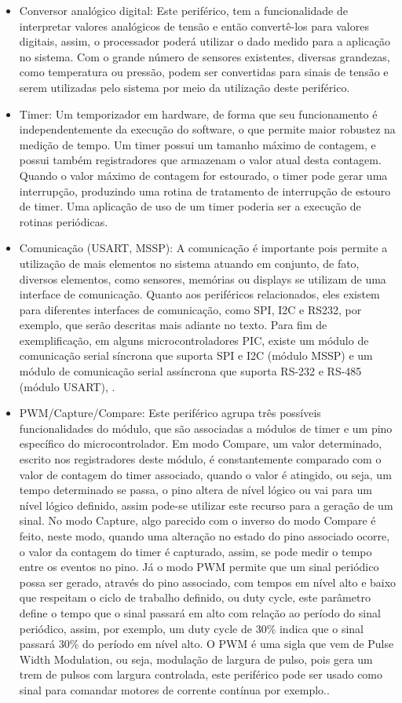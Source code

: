 \begin{itemize}
    \item Conversor analógico digital:
    Este periférico, tem a funcionalidade de interpretar valores analógicos de tensão e então convertê-los para valores digitais, assim, o processador poderá utilizar o dado medido para a aplicação no sistema. Com o grande número de sensores existentes, diversas grandezas, como temperatura ou pressão, podem ser convertidas para sinais de tensão e serem utilizadas pelo sistema por meio da utilização deste periférico.
    \item Timer:
    Um temporizador em hardware, de forma que seu funcionamento é independentemente da execução do software, o que permite maior robustez na medição de tempo. Um timer possui um tamanho máximo de contagem, e possui também registradores que armazenam o valor atual desta contagem. Quando o valor máximo de contagem for estourado, o timer pode gerar uma interrupção, produzindo uma rotina de tratamento de interrupção de estouro de timer. Uma aplicação de uso de um timer poderia ser a execução de rotinas periódicas. 
    \item Comunicação (USART, MSSP):
    A comunicação é importante pois permite a utilização de mais elementos no sistema atuando em conjunto, de fato, diversos elementos, como sensores, memórias ou displays se utilizam de uma interface de comunicação.  Quanto aos periféricos relacionados, eles existem para diferentes interfaces de comunicação, como SPI, I2C e RS232, por exemplo, que serão descritas mais adiante no texto. Para fim de exemplificação, em alguns microcontroladores PIC, existe um módulo de comunicação serial síncrona que suporta SPI e I2C (módulo MSSP) e um módulo de comunicação serial assíncrona que suporta RS-232 e RS-485 (módulo USART), \cite{pic18:DS39500A}. 
    \item PWM/Capture/Compare:
    Este periférico agrupa três possíveis funcionalidades do módulo, que são associadas a módulos de timer e um pino específico do microcontrolador. Em modo Compare, um valor determinado, escrito nos registradores deste módulo, é constantemente comparado com o valor de contagem do timer associado, quando o valor é atingido, ou seja, um tempo determinado se passa, o pino altera de nível lógico ou vai para um nível lógico definido, assim pode-se utilizar este recurso para a geração de um sinal. No modo Capture, algo parecido com o inverso do modo Compare é feito, neste modo, quando uma alteração no estado do pino associado ocorre, o valor da contagem do timer é capturado, assim, se pode medir o tempo entre os eventos no pino. Já o modo PWM permite que um sinal periódico possa ser gerado, através do pino associado, com tempos em nível alto e baixo que respeitam o ciclo de trabalho definido, ou duty cycle, este parâmetro define o tempo que o sinal passará em alto com relação ao período do sinal periódico, assim, por exemplo, um duty cycle de 30\% indica que o sinal passará 30\% do período em nível alto. O PWM é uma sigla que vem de Pulse Width Modulation, ou seja, modulação de largura de pulso, pois gera um trem de pulsos com largura controlada, este periférico pode ser usado como sinal para comandar motores de corrente contínua por exemplo.\cite{pic18:DS39500A}. 

\end{itemize}
